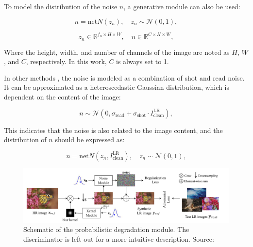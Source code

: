     
    To model the distribution of the noise $n$, a  generative module can also be used:

    \begin{equation}
        n = \text{net}N(z_n), \quad z_n \sim \mathcal{N}(0,1),
    \end{equation}

    \begin{equation}
        z_n \in \mathbb{R}^{f_n \times H \times W}, \quad n \in \mathbb{R}^{C \times H \times W },
    \end{equation}

    Where the height, width, and number of channels of the image are noted as $H$, $W$, and $C$, respectively. 
    In this work, $C$ is always set to 1.

    In other methods \cite{plotz2017benchmarking}, the noise is modeled as a combination of shot and read noise. 
    It can be approximated as a heteroscedastic Gaussian distribution, which is dependent on the content of the image:

    \begin{equation}
        n \sim \mathcal{N}(0, \sigma_{\text{read}} + \sigma_{\text{shot}} \cdot I^{\text{LR}}_{\text{clean}}),
    \end{equation}

    This indicates that the noise is also related to the image content, and the distribution of $n$ should be expressed as:


    \begin{equation}
        n = \text{net}N(z_n,I^{\text{LR}}_{\text{clean}}), \quad z_n \sim \mathcal{N}(0,1),
    \end{equation}

    \begin{figure}[h!]
        \centering
        \includegraphics[width=\textwidth]{Includes/3-probabilistic-degradation-model.png}
        \caption{Schematic of the probabilistic degradation module.
                The discriminator is left out for a more intuitive description. Source: \cite{luo2022learning}}
        \label{fig:3-probabilistic-degradation-model}
    \end{figure}

